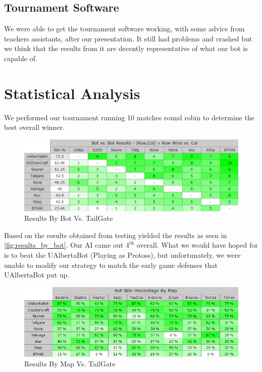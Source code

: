 \documentclass{article}
\begin{document}
\subsection{Tournament Software}

We were able to get the tournament software working, with some advice from teachers assistants, after our presentation. It still had problems and crashed but we think that the results from it are decently representative of what our bot is capable of.

\section{Statistical Analysis}

We performed our tournament running 10 matches round robin to determine the best overall winner.

\begin{figure}[h]
	\includegraphics[width=\textwidth]{images/results-by-bot.png}
	\caption{Results By Bot Vs. TailGate}
    \label{fig:results_by_bot}
\end{figure}

Based on the results obtained from testing yielded the results as seen in \autoref{fig:results_by_bot}. Our AI came out $4^{\text{th}}$ overall. What we would have hoped for is to beat the UAlbertaBot (Playing as Protoss), but unfortunately, we were unable to modify our strategy to match the early game defenses that UAlbertaBot put up.


\begin{figure}[h]
	\includegraphics[width=\textwidth]{images/results-by-map.png}
	\caption{Results By Map Vs. TailGate}
    \label{fig:results_by_map}
\end{figure}
\end{document}
